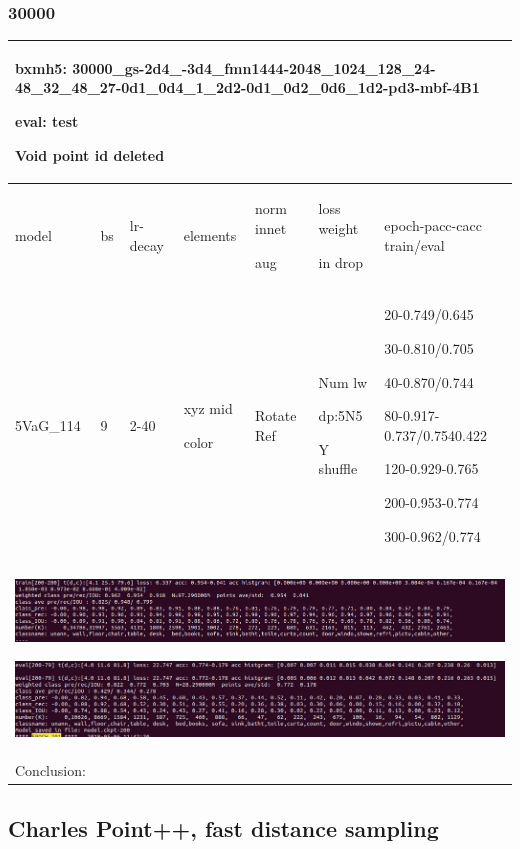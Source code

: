 \documentclass[,table,dvipsnames]{article}
\begin{document}
\subsubsection{30000}
\begin{tabular}{|p{1.5cm}|p{1.5cm}|p{1cm}|p{1.5cm}|p{1.5cm}|p{1.5cm}|p{5cm}| }
	\hline
	\multicolumn{7}{|p{14cm}|}{bxmh5: 30000\_gs-2d4\_-3d4\_fmn1444-2048\_1024\_128\_24-48\_32\_48\_27-0d1\_0d4\_1\_2d2-0d1\_0d2\_0d6\_1d2-pd3-mbf-4B1  \par eval: test \par Void point id deleted} \\
	\hline
	model & bs& lr-decay & elements & norm innet\par aug & loss weight\par in drop & epoch-pacc-cacc train/eval \\
	\hline
	
	5VaG\_114 & 9 &2-40 & xyz mid\par color & Rotate Ref & Num lw\par dp:5N5\par Y shuffle & 20-0.749/0.645\par 30-0.810/0.705\par 40-0.870/0.744\par 80-0.917-0.737/0.7540.422\par 120-0.929-0.765\par 200-0.953-0.774\par 300-0.962/0.774\\
	\hline
	\multicolumn{7}{|p{14cm}|}{ \includegraphics[width=\textheight]{images/svoxel/novoid/train} \par 
	\includegraphics[width=\textheight]{images/svoxel/novoid/test}} \\
	\hline
	
	\multicolumn{7}{|p{14cm}|}{ Conclusion:\par	 } \\
	\hline
\end{tabular}

\subsection{Charles Point++, fast distance sampling}	
\end{document}
